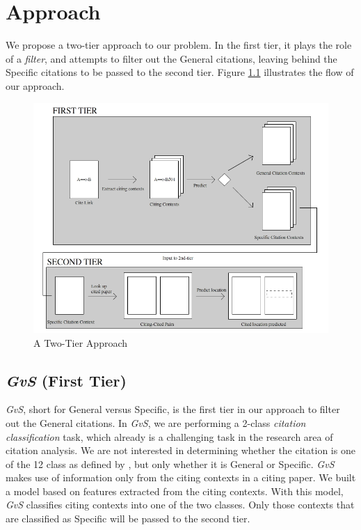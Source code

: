 \chapter{Approach}
\label{approach}
We propose a two-tier approach to our problem. In the first tier, it plays the role of a \textit{filter}, and attempts to filter out the General citations, leaving behind the Specific citations to be passed to the second tier. Figure \ref{fig:twotier} illustrates the flow of our approach.
\begin{figure}[h]
  \centering
  \includegraphics[scale=0.60]{./twotier}
  \caption{A Two-Tier Approach}
  \label{fig:twotier}
\end{figure}

\section{{\it GvS} (First Tier)}
\label{firsttier}
{\it GvS}, short for General versus Specific, is the first tier in our approach to filter out the General citations. In {\it GvS}, we are performing a 2-class \textit{citation classification} task, which already is a challenging task in the research area of citation analysis. We are not interested in determining whether the citation is one of the 12 class as defined by \cite{teufel2009annotation}, but only whether it is General or Specific. {\it GvS} makes use of information only from the citing contexts in a citing paper. We built a model based on features extracted from the citing contexts. With this model, {\it GvS} classifies citing contexts into one of the two classes. Only those contexts that are classified as Specific will be passed to the second tier.

